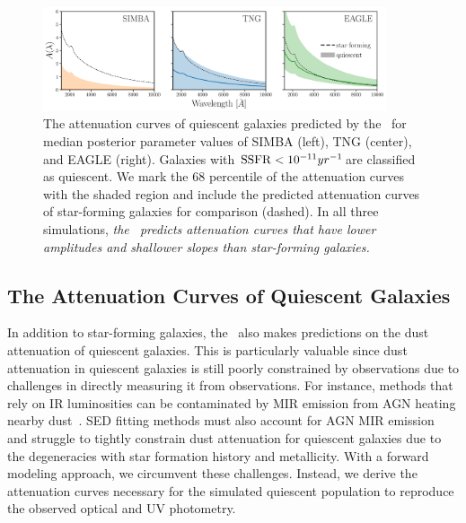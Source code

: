 \begin{figure}
\begin{center}
    \includegraphics[width=0.9\textwidth]{figs/abc_q_atten_unnorm.pdf}
    \caption{\label{fig:q_raw_atten}
    The attenuation curves of quiescent galaxies predicted by the \eda~for
    median posterior parameter values of SIMBA (left), TNG (center), and
    EAGLE (right).
    Galaxies with ${\rm SSFR} < 10^{-11}yr^{-1}$are classified as quiescent.
    We mark the 68 percentile of the attenuation curves with the shaded region
    and include the predicted attenuation curves of star-forming galaxies for
    comparison (dashed). 
    In all three simulations, \emph{the \eda~predicts attenuation curves that
    have lower amplitudes and shallower slopes than star-forming galaxies.}
    }
\end{center}
\end{figure}
\subsection{The Attenuation Curves of Quiescent Galaxies}  
In addition to star-forming galaxies, the \eda~also makes predictions on the
dust attenuation of quiescent galaxies. 
This is particularly valuable since dust attenuation in quiescent galaxies is
still poorly constrained by observations due to challenges in directly
measuring it from observations. 
For instance, methods that rely on IR luminosities can be contaminated by MIR
emission from AGN heating nearby dust~\citep{kirkpatrick2015}. 
SED fitting methods must also account for AGN MIR
emission~\citep{salim2016, leja2018, salim2018} and struggle to tightly
constrain dust attenuation for quiescent galaxies due to the degeneracies
with star formation history and metallicity.
With a forward modeling approach, we circumvent these challenges. 
Instead, we derive the attenuation curves necessary for the simulated quiescent
population to reproduce the observed optical and UV photometry. 

